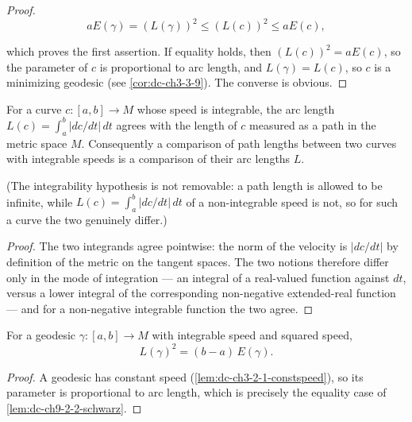 \begin{proof}
  \leanok
  \sketch
  $$
  aE(\gamma)=(L(\gamma))^2\le(L(c))^2\le aE(c),
  $$

  which proves the first assertion. If equality holds, then $(L(c))^2=aE(c)$, so the
  parameter of $c$ is proportional to arc length, and $L(\gamma)=L(c)$, so $c$ is a
  minimizing geodesic (see \cref{cor:dc-ch3-3-9}). The converse is obvious.

\end{proof}
\begin{lemma}
  \label{lem:dc-ch9-2-3-arclength-bridge}
  \leanok
  For a curve $c:[a,b]\to M$ whose speed is integrable, the arc length
  $L(c)=\int_a^b|dc/dt|\,dt$ agrees with the length of $c$
  measured as a path in the metric space $M$. Consequently a comparison of path lengths
  between two curves with integrable speeds is a comparison of their arc lengths $L$.

  (The integrability hypothesis is not removable: a path length is allowed to be infinite,
  while $L(c)=\int_a^b|dc/dt|\,dt$ of a non-integrable speed is not, so for such a curve the
  two genuinely differ.)
\end{lemma}
\begin{proof}
  \leanok
  \sketch
  The two integrands agree pointwise: the norm of the velocity is $|dc/dt|$ by definition of
  the metric on the tangent spaces. The two notions therefore differ only in the mode of
  integration --- an integral of a real-valued function against $dt$, versus a lower integral
  of the corresponding non-negative extended-real function --- and for a non-negative
  integrable function the two agree.
\end{proof}
\begin{lemma}
  \label{lem:dc-ch9-2-3-geodesic-equality}
  \leanok
  For a geodesic $\gamma:[a,b]\to M$ with integrable speed and squared speed,
  $$
  L(\gamma)^2 = (b-a)\,E(\gamma).
  $$
\end{lemma}
\begin{proof}
  \leanok
  \sketch
  A geodesic has constant speed (\cref{lem:dc-ch3-2-1-constspeed}), so its parameter is
  proportional to arc length, which is precisely the equality case of
  \cref{lem:dc-ch9-2-2-schwarz}.

\end{proof}
